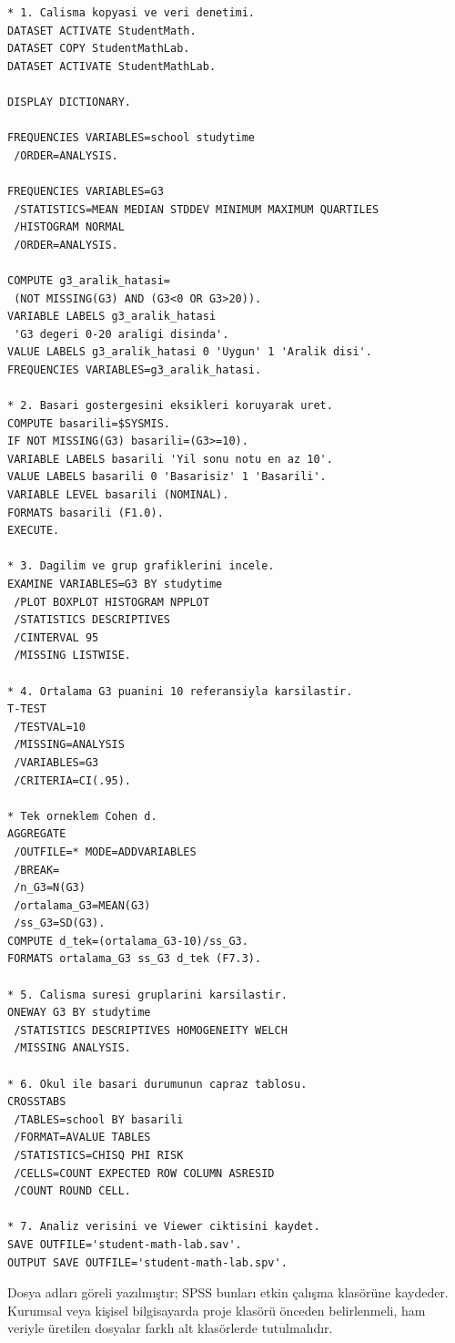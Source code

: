 \begin{lstlisting}[language={}]
* 1. Calisma kopyasi ve veri denetimi.
DATASET ACTIVATE StudentMath.
DATASET COPY StudentMathLab.
DATASET ACTIVATE StudentMathLab.

DISPLAY DICTIONARY.

FREQUENCIES VARIABLES=school studytime
 /ORDER=ANALYSIS.

FREQUENCIES VARIABLES=G3
 /STATISTICS=MEAN MEDIAN STDDEV MINIMUM MAXIMUM QUARTILES
 /HISTOGRAM NORMAL
 /ORDER=ANALYSIS.

COMPUTE g3_aralik_hatasi=
 (NOT MISSING(G3) AND (G3<0 OR G3>20)).
VARIABLE LABELS g3_aralik_hatasi
 'G3 degeri 0-20 araligi disinda'.
VALUE LABELS g3_aralik_hatasi 0 'Uygun' 1 'Aralik disi'.
FREQUENCIES VARIABLES=g3_aralik_hatasi.

* 2. Basari gostergesini eksikleri koruyarak uret.
COMPUTE basarili=$SYSMIS.
IF NOT MISSING(G3) basarili=(G3>=10).
VARIABLE LABELS basarili 'Yil sonu notu en az 10'.
VALUE LABELS basarili 0 'Basarisiz' 1 'Basarili'.
VARIABLE LEVEL basarili (NOMINAL).
FORMATS basarili (F1.0).
EXECUTE.

* 3. Dagilim ve grup grafiklerini incele.
EXAMINE VARIABLES=G3 BY studytime
 /PLOT BOXPLOT HISTOGRAM NPPLOT
 /STATISTICS DESCRIPTIVES
 /CINTERVAL 95
 /MISSING LISTWISE.

* 4. Ortalama G3 puanini 10 referansiyla karsilastir.
T-TEST
 /TESTVAL=10
 /MISSING=ANALYSIS
 /VARIABLES=G3
 /CRITERIA=CI(.95).

* Tek orneklem Cohen d.
AGGREGATE
 /OUTFILE=* MODE=ADDVARIABLES
 /BREAK=
 /n_G3=N(G3)
 /ortalama_G3=MEAN(G3)
 /ss_G3=SD(G3).
COMPUTE d_tek=(ortalama_G3-10)/ss_G3.
FORMATS ortalama_G3 ss_G3 d_tek (F7.3).

* 5. Calisma suresi gruplarini karsilastir.
ONEWAY G3 BY studytime
 /STATISTICS DESCRIPTIVES HOMOGENEITY WELCH
 /MISSING ANALYSIS.

* 6. Okul ile basari durumunun capraz tablosu.
CROSSTABS
 /TABLES=school BY basarili
 /FORMAT=AVALUE TABLES
 /STATISTICS=CHISQ PHI RISK
 /CELLS=COUNT EXPECTED ROW COLUMN ASRESID
 /COUNT ROUND CELL.

* 7. Analiz verisini ve Viewer ciktisini kaydet.
SAVE OUTFILE='student-math-lab.sav'.
OUTPUT SAVE OUTFILE='student-math-lab.spv'.
\end{lstlisting}

Dosya adları göreli yazılmıştır; SPSS bunları etkin çalışma klasörüne
kaydeder. Kurumsal veya kişisel bilgisayarda proje klasörü önceden
belirlenmeli, ham veriyle üretilen dosyalar farklı alt klasörlerde tutulmalıdır.

